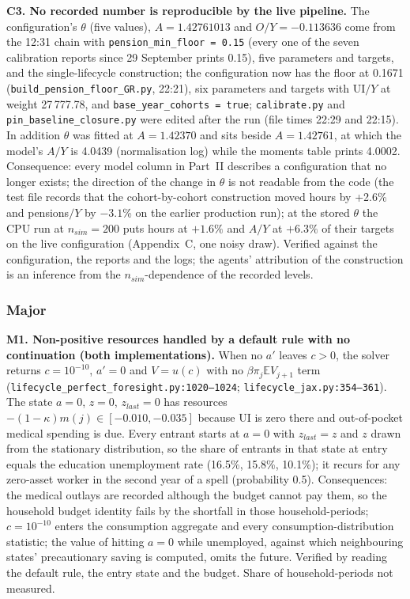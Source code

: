 \documentclass[11pt,a4paper]{article}
\newcommand{\code}[1]{\texttt{#1}}
\begin{document}
\textbf{C3. No recorded number is reproducible by the live pipeline.} The configuration's $\theta$ (five values), $A = 1.42761013$ and $O/Y = -0.113636$ come from the 12:31 chain with \code{pension_min_floor = 0.15} (every one of the seven calibration reports since 29 September prints 0.15), five parameters and targets, and the single-lifecycle construction; the configuration now has the floor at 0.1671 (\code{build_pension_floor_GR.py}, 22:21), six parameters and targets with UI$/Y$ at weight 27\,777.78, and \code{base_year_cohorts = true}; \code{calibrate.py} and \code{pin_baseline_closure.py} were edited after the run (file times 22:29 and 22:15). In addition $\theta$ was fitted at $A = 1.42370$ and sits beside $A = 1.42761$, at which the model's $A/Y$ is 4.0439 (normalisation log) while the moments table prints 4.0002. Consequence: every model column in Part~II describes a configuration that no longer exists; the direction of the change in $\theta$ is not readable from the code (the test file records that the cohort-by-cohort construction moved hours by +2.6\% and pensions$/Y$ by $-3.1$\% on the earlier production run); at the stored $\theta$ the CPU run at $n_{sim} = 200$ puts hours at $+1.6\%$ and $A/Y$ at $+6.3\%$ of their targets on the live configuration (Appendix~C, one noisy draw). Verified against the configuration, the reports and the logs; the agents' attribution of the construction is an inference from the $n_{sim}$-dependence of the recorded levels.

\subsubsection*{Major}

\textbf{M1. Non-positive resources handled by a default rule with no continuation (both implementations).} When no $a'$ leaves $c > 0$, the solver returns $c = 10^{-10}$, $a' = 0$ and $V = u(c)$ with no $\beta\pi_j\mathbb{E}V_{j+1}$ term (\code{lifecycle_perfect_foresight.py:1020--1024}; \code{lifecycle_jax.py:354--361}). The state $a = 0$, $z = 0$, $z_{last} = 0$ has resources $-(1-\kappa)m(j) \in [-0.010, -0.035]$ because UI is zero there and out-of-pocket medical spending is due. Every entrant starts at $a = 0$ with $z_{last} = z$ and $z$ drawn from the stationary distribution, so the share of entrants in that state at entry equals the education unemployment rate (16.5\%, 15.8\%, 10.1\%); it recurs for any zero-asset worker in the second year of a spell (probability 0.5). Consequences: the medical outlays are recorded although the budget cannot pay them, so the household budget identity fails by the shortfall in those household-periods; $c = 10^{-10}$ enters the consumption aggregate and every consumption-distribution statistic; the value of hitting $a = 0$ while unemployed, against which neighbouring states' precautionary saving is computed, omits the future. Verified by reading the default rule, the entry state and the budget. Share of household-periods not measured.
\end{document}
